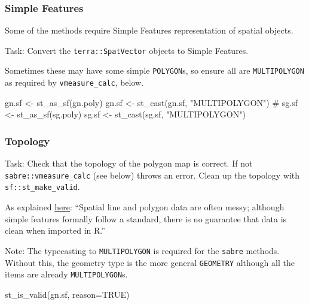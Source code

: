 \documentclass[
  letterpaper,
  DIV=11,
  numbers=noendperiod]{scrartcl}
\newenvironment{Shaded}{\begin{snugshade}}{\end{snugshade}}
\newcommand{\AttributeTok}[1]{\textcolor[rgb]{0.40,0.45,0.13}{#1}}
\newcommand{\CommentTok}[1]{\textcolor[rgb]{0.37,0.37,0.37}{#1}}
\newcommand{\ConstantTok}[1]{\textcolor[rgb]{0.56,0.35,0.01}{#1}}
\newcommand{\FunctionTok}[1]{\textcolor[rgb]{0.28,0.35,0.67}{#1}}
\newcommand{\NormalTok}[1]{\textcolor[rgb]{0.00,0.23,0.31}{#1}}
\newcommand{\OtherTok}[1]{\textcolor[rgb]{0.00,0.23,0.31}{#1}}
\newcommand{\StringTok}[1]{\textcolor[rgb]{0.13,0.47,0.30}{#1}}
\begin{document}
\hypertarget{simple-features}{%
\subsubsection{Simple Features}\label{simple-features}}

Some of the methods require Simple Features representation of spatial
objects.

Task: Convert the \texttt{terra::SpatVector} objects to Simple Features.

Sometimes these may have some simple \texttt{POLYGON}s, so ensure all
are \texttt{MULTIPOLYGON} as required by \texttt{vmeasure\_calc}, below.

\begin{Shaded}
\begin{Highlighting}[]
\NormalTok{gn.sf }\OtherTok{\textless{}{-}} \FunctionTok{st\_as\_sf}\NormalTok{(gn.poly)}
\NormalTok{gn.sf }\OtherTok{\textless{}{-}} \FunctionTok{st\_cast}\NormalTok{(gn.sf, }\StringTok{"MULTIPOLYGON"}\NormalTok{)}
\CommentTok{\#}
\NormalTok{sg.sf }\OtherTok{\textless{}{-}} \FunctionTok{st\_as\_sf}\NormalTok{(sg.poly)}
\NormalTok{sg.sf }\OtherTok{\textless{}{-}} \FunctionTok{st\_cast}\NormalTok{(sg.sf, }\StringTok{"MULTIPOLYGON"}\NormalTok{)}
\end{Highlighting}
\end{Shaded}

\hypertarget{topology}{%
\subsubsection{Topology}\label{topology}}

Task: Check that the topology of the polygon map is correct. If not
\texttt{sabre::vmeasure\_calc} (see below) throws an error. Clean up the
topology with \texttt{sf::st\_make\_valid}.

As explained
\href{https://www.r-spatial.org/r/2017/03/19/invalid.html}{here}:
``Spatial line and polygon data are often messy; although simple
features formally follow a standard, there is no guarantee that data is
clean when imported in R.''

Note: The typecasting to \texttt{MULTIPOLYGON} is required for the
\texttt{sabre} methods. Without this, the geometry type is the more
general \texttt{GEOMETRY} although all the items are already
\texttt{MULTIPOLYGON}s.

\begin{Shaded}
\begin{Highlighting}[]
\FunctionTok{st\_is\_valid}\NormalTok{(gn.sf, }\AttributeTok{reason=}\ConstantTok{TRUE}\NormalTok{)}
\end{Highlighting}
\end{Shaded}
\end{document}
